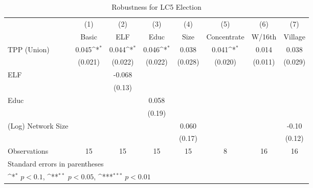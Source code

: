 \begin{table}[htbp]\centering
\def\sym#1{\ifmmode^{#1}\else\(^{#1}\)\fi}
\caption{Robustness for LC5 Election\label{tablerobustnessLC5chair}}
\begin{tabular}{l*{7}{c}}
\toprule
                &\multicolumn{1}{c}{(1)}&\multicolumn{1}{c}{(2)}&\multicolumn{1}{c}{(3)}&\multicolumn{1}{c}{(4)}&\multicolumn{1}{c}{(5)}&\multicolumn{1}{c}{(6)}&\multicolumn{1}{c}{(7)}\\
                &\multicolumn{1}{c}{Basic}&\multicolumn{1}{c}{ELF}&\multicolumn{1}{c}{Educ}&\multicolumn{1}{c}{Size}&\multicolumn{1}{c}{Concentrate}&\multicolumn{1}{c}{W/16th}&\multicolumn{1}{c}{Village}\\
\midrule
TPP (Union)     &    0.045\sym{*}  &    0.044\sym{*}  &    0.046\sym{*}  &    0.038         &    0.041\sym{*}  &    0.014         &    0.038         \\
                &  (0.021)         &  (0.022)         &  (0.022)         &  (0.028)         &  (0.020)         &  (0.011)         &  (0.029)         \\
ELF             &                  &   -0.068         &                  &                  &                  &                  &                  \\
                &                  &   (0.13)         &                  &                  &                  &                  &                  \\
Educ            &                  &                  &    0.058         &                  &                  &                  &                  \\
                &                  &                  &   (0.19)         &                  &                  &                  &                  \\
(Log) Network Size&                  &                  &                  &    0.060         &                  &                  &    -0.10         \\
                &                  &                  &                  &   (0.17)         &                  &                  &   (0.12)         \\
\midrule
Observations    &       15         &       15         &       15         &       15         &        8         &       16         &       16         \\
\bottomrule
\multicolumn{8}{l}{\footnotesize Standard errors in parentheses}\\
\multicolumn{8}{l}{\footnotesize \sym{*} \(p<0.1\), \sym{**} \(p<0.05\), \sym{***} \(p<0.01\)}\\
\end{tabular}
\end{table}
